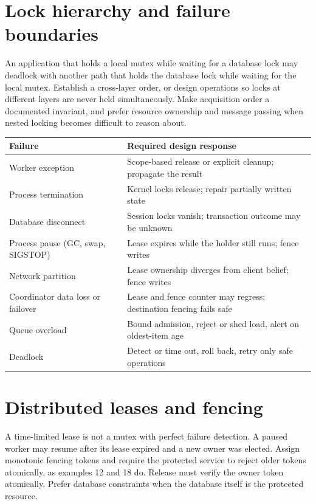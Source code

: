 \documentclass[11pt,openany]{book}
\begin{document}

\section{Lock hierarchy and failure boundaries}
An application that holds a local mutex while waiting for a database lock may deadlock with another path that holds the database lock while waiting for the local mutex. Establish a cross-layer order, or design operations so locks at different layers are never held simultaneously. Make acquisition order a documented invariant, and prefer resource ownership and message passing when nested locking becomes difficult to reason about.
\begin{longtable}{L{.25\linewidth}L{.67\linewidth}}\toprule Failure & Required design response \\ \midrule\endhead
Worker exception & Scope-based release or explicit cleanup; propagate the result \\
Process termination & Kernel locks release; repair partially written state \\
Database disconnect & Session locks vanish; transaction outcome may be unknown \\
Process pause (GC, swap, SIGSTOP) & Lease expires while the holder still runs; fence writes \\
Network partition & Lease ownership diverges from client belief; fence writes \\
Coordinator data loss or failover & Lease and fence counter may regress; destination fencing fails safe \\
Queue overload & Bound admission, reject or shed load, alert on oldest-item age \\
Deadlock & Detect or time out, roll back, retry only safe operations \\
\bottomrule\end{longtable}
\section{Distributed leases and fencing}
A time-limited lease is not a mutex with perfect failure detection. A paused worker may resume after its lease expired and a new owner was elected. Assign monotonic fencing tokens and require the protected service to reject older tokens atomically, as examples 12 and 18 do. Release must verify the owner token atomically. Prefer database constraints when the database itself is the protected resource.
\end{document}
